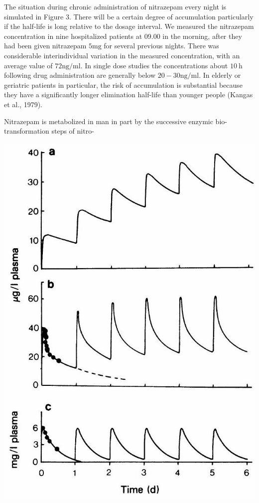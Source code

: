 \documentclass[10pt]{article}
\begin{document}
The situation during chronic administration of nitrazepam every night is simulated in Figure 3. There will be a certain degree of accumulation particularly if the half-life is long relative to the dosage interval. We measured the nitrazepam concentration in nine hospitalized patients at 09.00 in the morning, after they had been given nitrazepam $5 \mathrm{mg}$ for several previous nights. There was considerable interindividual variation in the measured concentration, with an average value of $72 \mathrm{ng} / \mathrm{ml}$. In single dose studies the concentrations about $10 \mathrm{~h}$ following drug administration are generally below $20-30 \mathrm{ng} / \mathrm{ml}$. In elderly or geriatric patients in particular, the risk of accumulation is substantial because they have a significantly longer elimination half-life than younger people (Kangas et al., 1979).

Nitrazepam is metabolized in man in part by the successive enzymic bio-transformation steps of nitro-

\begin{center}
\includegraphics[max width=\textwidth]{2024_06_20_8ae6f73ba2f120e73ed4g-4}
\end{center}
\end{document}
